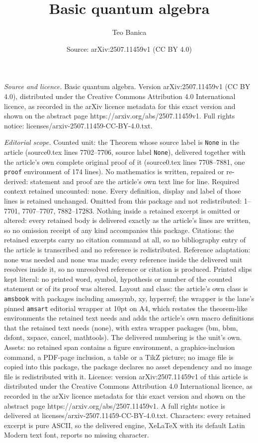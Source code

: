 \documentclass[10pt,a4paper]{amsart}
\title[Basic quantum algebra]{Basic quantum algebra}
\author{Teo Banica}
\date{Source: arXiv:2507.11459v1 (CC BY 4.0)}
\begin{document}
\maketitle

\noindent\emph{Source and licence.} Basic quantum algebra. Version arXiv:2507.11459v1 (CC BY 4.0), distributed under the Creative Commons Attribution 4.0 International licence, as recorded in the arXiv licence metadata for this exact version and shown on the abstract page https://arxiv.org/abs/2507.11459v1. Full rights notice: licenses/arxiv-2507.11459-CC-BY-4.0.txt.\par\smallskip

\noindent\textit{Editorial scope.} Counted unit: the Theorem whose source label is \texttt{None} in the article (source0.tex lines 7702--7706, source label \texttt{None}), delivered together with the article's own complete original proof of it (source0.tex lines 7708--7881, one \texttt{proof} environment of 174 lines). No mathematics is written, repaired or re-derived: statement and proof are the article's own text line for line. Required context retained uncounted: none. Every definition, display and label of those lines is retained unchanged. Omitted from this package and not redistributed: 1--7701, 7707--7707, 7882--17283. Nothing inside a retained excerpt is omitted or altered: every retained body is delivered exactly as the article's lines are written, so no omission receipt of any kind accompanies this package. Citations: the retained excerpts carry no citation command at all, so no bibliography entry of the article is transcribed and no reference is redistributed. Reference adaptation: none was needed and none was made; every reference inside the delivered unit resolves inside it, so no unresolved reference or citation is produced. Printed slips kept literal: no printed word, symbol, hypothesis or number of the counted statement or of its proof was altered. Layout and class: the article's own class is \texttt{amsbook} with packages including amssymb, xy, hyperref; the wrapper is the lane's pinned \texttt{amsart} editorial wrapper at 10pt on A4, which restates the theorem-like environments the retained text needs and adds the article's own macro definitions that the retained text needs (none), with extra wrapper packages (bm, bbm, dsfont, xspace, cancel, mathtools). The delivered numbering is the unit's own. Assets: no retained span contains a figure environment, a graphics-inclusion command, a PDF-page inclusion, a table or a TikZ picture; no image file is copied into this package, the package declares no asset dependency and no image file is redistributed with it. Licence: version arXiv:2507.11459v1 of this article is distributed under the Creative Commons Attribution 4.0 International licence, as recorded in the arXiv licence metadata for this exact version and shown on the abstract page https://arxiv.org/abs/2507.11459v1. A full rights notice is delivered at licenses/arxiv-2507.11459-CC-BY-4.0.txt. Characters: every retained excerpt is pure ASCII, so the delivered engine, XeLaTeX with its default Latin Modern text font, reports no missing character.
\end{document}

